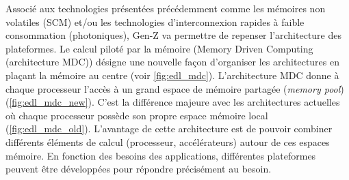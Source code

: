         Associé aux technologies présentées précédemment comme les mémoires non volatiles (SCM) et/ou les technologies d'interconnexion rapides à faible consommation (photoniques), Gen-Z va permettre de repenser l'architecture des plateformes. Le calcul piloté par la mémoire (Memory Driven Computing (architecture MDC)) désigne une nouvelle façon d'organiser les architectures en plaçant la mémoire au centre (voir \autoref{fig:edl_mdc}). L'architecture MDC donne à chaque processeur l'accès à un grand espace de mémoire partagée (\textit{memory pool}) (\autoref{fig:edl_mdc_new}). C'est la différence majeure avec les architectures actuelles où chaque processeur possède son propre espace mémoire local (\autoref{fig:edl_mdc_old}). L'avantage de cette architecture est de pouvoir combiner différents éléments de calcul (processeur, accélérateurs) autour de ces espaces mémoire. En fonction des besoins des applications, différentes plateformes peuvent être développées pour répondre précisément au besoin.
    

